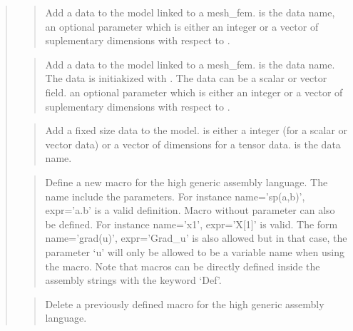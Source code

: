\documentclass[a4paper,11pt,english]{sphinxmanual}
\begin{document}
\begin{quote}
\begin{quote}
Add a data to the model linked to a mesh\_fem.  is the data name,
 an optional parameter which is either an
integer  or a vector of suplementary dimensions with respect to .
\end{quote}

\begin{quote}

Add a data to the model linked to a mesh\_fem.  is the data name.
The data is initiakized with . The data can be a scalar or vector
field.  an optional parameter which is either an
integer or a vector of suplementary dimensions with respect to .
\end{quote}

\begin{quote}

Add a fixed size data to the model.   is either a
integer (for a scalar or vector data) or a vector of dimensions
for a tensor data.  is the data name.
\end{quote}

\begin{quote}

Define a new macro for the high generic assembly language.
The name include the parameters. For instance name=’sp(a,b)’, expr=’a.b’
is a valid definition. Macro without parameter can also be defined.
For instance name=’x1’, expr=’X{[}1{]}’ is valid. The form name=’grad(u)’,
expr=’Grad\_u’ is also allowed but in that case, the parameter ‘u’ will
only be allowed to be a variable name when using the macro. Note that
macros can be directly defined inside the assembly strings with the
keyword ‘Def’.
\end{quote}

\begin{quote}

Delete a previously defined macro for the high generic assembly language.
\end{quote}


\end{quote}
\end{document}
